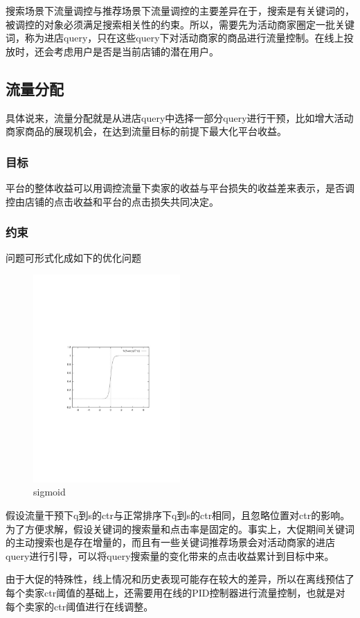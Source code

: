 搜索场景下流量调控与推荐场景下流量调控的主要差异在于，搜索是有关键词的，被调控的对象必须满足搜索相关性的约束。所以，需要先为活动商家圈定一批关键词，称为进店query，只在这些query下对活动商家的商品进行流量控制。在线上投放时，还会考虑用户是否是当前店铺的潜在用户。

\subsection{流量分配}
具体说来，流量分配就是从进店query中选择一部分query进行干预，比如增大活动商家商品的展现机会，在达到流量目标的前提下最大化平台收益。
\subsubsection{目标}
平台的整体收益可以用调控流量下卖家的收益与平台损失的收益差来表示，是否调控由店铺的点击收益和平台的点击损失共同决定。
\subsubsection{约束}
问题可形式化成如下的优化问题
\begin{figure}[htbp]
  \centering
  \includegraphics[width=0.5\textwidth]{pic/chap8/cp8p1.pdf}
  \caption{sigmoid}\label{fig:digit}
\end{figure}
假设流量干预下q到s的ctr与正常排序下q到s的ctr相同，且忽略位置对ctr的影响。
为了方便求解，假设关键词的搜索量和点击率是固定的。事实上，大促期间关键词的主动搜索也是存在增量的，而且有一些关键词推荐场景会对活动商家的进店query进行引导，可以将query搜索量的变化带来的点击收益累计到目标中来。

由于大促的特殊性，线上情况和历史表现可能存在较大的差异，所以在离线预估了每个卖家ctr阈值的基础上，还需要用在线的PID控制器进行流量控制，也就是对每个卖家的ctr阈值进行在线调整。


